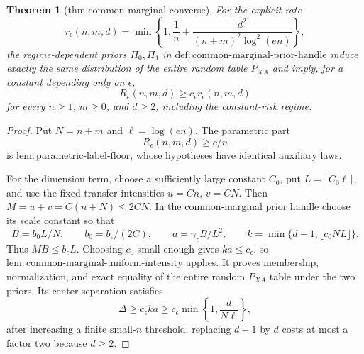 \documentclass{article}
\newtheorem{theorem}{Theorem}
\begin{document}
\begin{theorem}[thm:common-marginal-converse]\label{thm:common-marginal-converse}
For the explicit rate
\[
 r_\epsilon(n,m,d)=\min\!\left\{1,\frac1n+\frac{d^2}{(n+m)^2\log^2(en)}\right\},
\]
the regime-dependent priors \(\Pi_0,\Pi_1\) in \(\mathrm{def:common\mbox{-}marginal\mbox{-}prior\mbox{-}handle}\) induce exactly the same distribution of the entire random table \(P_{XA}\) and imply, for a constant depending only on \(\epsilon\),
\[
 R_\epsilon(n,m,d)\ge c_\epsilon r_\epsilon(n,m,d)
\]
for every \(n\ge1\), \(m\ge0\), and \(d\ge2\), including the constant-risk regime.
\end{theorem}
\begin{proof}
Put \(N=n+m\) and \(\ell=\log(en)\).  The parametric part
\[
 R_\epsilon(n,m,d)\ge c/n                                           \tag{C54}
\]
is \(\mathrm{lem:parametric\mbox{-}label\mbox{-}floor}\), whose hypotheses have identical auxiliary laws.

For the dimension term, choose a sufficiently large constant \(C_0\), put \(L=\lceil C_0\ell\rceil\), and use the fixed-transfer intensities \(u=Cn\), \(v=CN\).  Then \(M=u+v=C(n+N)\le2CN\).  In the common-marginal prior handle choose its scale constant so that
\[
 B=b_0L/N,\qquad b_0=b_\epsilon/(2C),\qquad
 a=\gamma_\epsilon B/L^2,\qquad
 k=\min\{d-1,\lfloor c_0NL\rfloor\}.                              \tag{C55}
\]
Thus \(MB\le b_\epsilon L\).  Choosing \(c_0\) small enough gives \(ka\le c_\epsilon\), so \(\mathrm{lem:common\mbox{-}marginal\mbox{-}uniform\mbox{-}intensity}\) applies.  It proves membership, normalization, and exact equality of the entire random \(P_{XA}\) table under the two priors.  Its center separation satisfies
\[
 \Delta\ge c_\epsilon ka
 \ge c_\epsilon\min\!\left\{1,\frac d{N\ell}\right\},             \tag{C56}
\]
after increasing a finite small-\(n\) threshold; replacing \(d-1\) by \(d\) costs at most a factor two because \(d\ge2\).


\end{proof}
\end{document}
